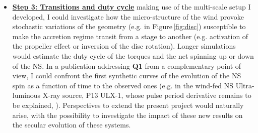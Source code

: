 \documentclass[letterpaper,12pt,onecolumn]{article}
\makeatletter
\newcommand*{\hmxb}{HMXB\@\xspace}
\newcommand*{\ns}{NS\@\xspace}
\newcommand*{\eg}{e.g.\@\xspace}
\makeatother
\begin{document}
\begin{itemize}[label={}]
\item \textbf{\underline{Step 3: Transitions and duty cycle}} making use of the multi-scale setup I developed, I could investigate how the micro-structure of the wind provoke stochastic variations of the geometry (\eg in Figure\,\ref{fig:disc}) susceptible to make the accretion regime transit from a stage to another (\eg activation of the propeller effect or inversion of the disc rotation). Longer simulations would estimate the duty cycle of the torques and the net spinning up or down of the \ns. In a publication addressing \textbf{Q1} from a complementary point of view, I could confront the first synthetic curves of the evolution of the \ns spin as a function of time to the observed ones (\eg in the wind-fed \ns Ultra-luminous X-ray source, P13 ULX-1, whose pulse period derivative remains to be explained, \citep{Fuerst2018}). Perspectives to extend the present project would naturally arise, with the possibility to investigate the impact of these new results on the secular evolution of these systems.
\end{itemize}

%
%
%
%
%
%
\end{document}
